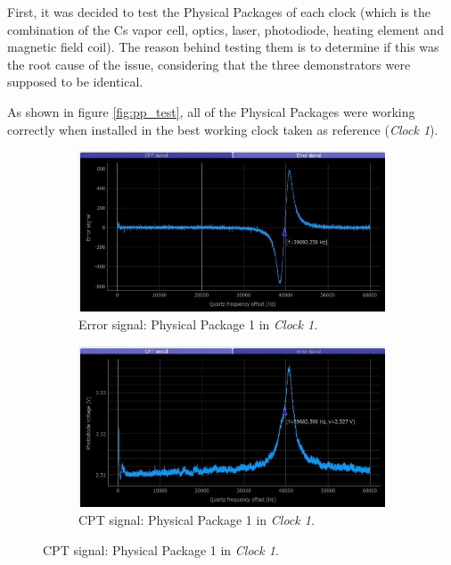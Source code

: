 \documentclass[a4paper,12pt]{article}
\begin{document}
First, it was decided to test the Physical Packages of each clock (which is the combination of the Cs vapor cell, optics, laser, photodiode, heating element and magnetic field coil). The reason behind testing them is to determine if this was the root cause of the issue, considering that the three demonstrators were supposed to be identical.

As shown in figure \ref{fig:pp_test}, all of the Physical Packages were working correctly when installed in the best working clock taken as reference (\textit{Clock 1}).

\begin{figure}[!h]
\centering
\begin{subfigure}[b]{0.49\textwidth}
\centering
\includegraphics[height=0.5\textwidth]{Images/c1_pp1_1_2.jpg}
\captionsetup{justification=centering}
\caption{Error signal: Physical Package 1 in \textit{Clock 1}.}
\end{subfigure}
\hfill
\begin{subfigure}[b]{0.49\textwidth}
\centering
\includegraphics[height=0.5\textwidth]{Images/c1_pp1_2_2.jpg}
\captionsetup{justification=centering}
\caption{CPT signal: Physical Package 1 in \textit{Clock 1}.}
\end{subfigure}


\end{figure}
\end{document}
